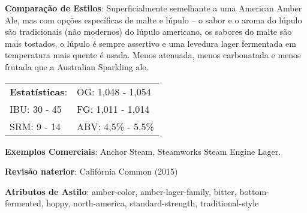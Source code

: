 \textbf{Comparação de Estilos}: Superficialmente semelhante a uma American Amber Ale, mas com opções específicas de malte e lúpulo – o sabor e o aroma do lúpulo são tradicionais (não modernos) do lúpulo americano, os sabores do malte são mais tostados, o lúpulo é sempre assertivo e uma levedura lager fermentada em temperatura mais quente é usada. Menos atenuada, menos carbonatada e menos frutada que a Australian Sparkling ale.

\begin{tabular}{@{}p{35mm}p{35mm}@{}}
  \textbf{Estatísticas}: & OG: 1,048 - 1,054 \\
  IBU: 30 - 45  & FG: 1,011 - 1,014  \\
  SRM: 9 - 14  & ABV: 4,5\% - 5,5\%
\end{tabular}

\textbf{Exemplos Comerciais}: Anchor Steam, Steamworks Steam Engine Lager.

\textbf{Revisão naterior}: Califórnia Common (2015)

\textbf{Atributos de Astilo}: amber-color, amber-lager-family, bitter, bottom-fermented, hoppy, north-america, standard-strength, traditional-style
